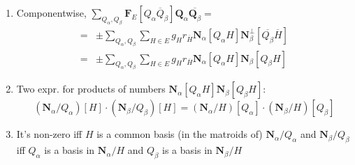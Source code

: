 \documentclass{beamer}
\newcommand{\ext}[1]{\ensuremath{\mathbf{#1}}}
\begin{document}
\begin{frame}
      \begin{corollary}
    \begin{enumerate}
     \item
       Componentwise, $\sum_{Q_\alpha,Q_\beta} \ext{F}_E[Q_\alpha \overline{Q}_\beta]
       \ext{Q}_\alpha\overline{\ext{Q}_\beta}=$
       \[
       \begin{split}
       =&\pm\sum_{Q_\alpha,Q_\beta}\sum_{H\in E} g_H r_{\overline{H}}
       \ext{N}_\alpha[Q_\alpha H]
       \ext{N}_\beta^\perp[\overline{Q_\beta}\overline{H}]\\
       =&
       \pm\sum_{Q_\alpha,Q_\beta}\sum_{H\in E}g_H r_{\overline{H}}
       \ext{N}_\alpha[Q_\alpha H]
       \ext{N}_\beta[Q_\beta H]
       \end{split}
       \]
     \item
       Two expr. for  products of numbers  $\ext{N}_\alpha[Q_\alpha H]
       \ext{N}_\beta[Q_\beta H]$:
       \[
       (\ext{N}_\alpha/Q_\alpha)[H]\cdot (\ext{N}_\beta/Q_\beta)[H]
       =
        (\ext{N}_\alpha/H)[Q_\alpha]\cdot (\ext{N}_\beta/H)[Q_\beta]
       \]
     \item
       It's non-zero iff $H$  is a common basis (in the matroids of)
       $\ext{N}_\alpha/Q_\alpha$ and $\ext{N}_\beta/Q_\beta$\\
       iff $Q_\alpha$ is a basis in $\ext{N}_\alpha/H$ and
       $Q_\beta$ is a basis in $\ext{N}_\beta/H$
    \end{enumerate}
  \end{corollary}
\end{frame}
\end{document}
